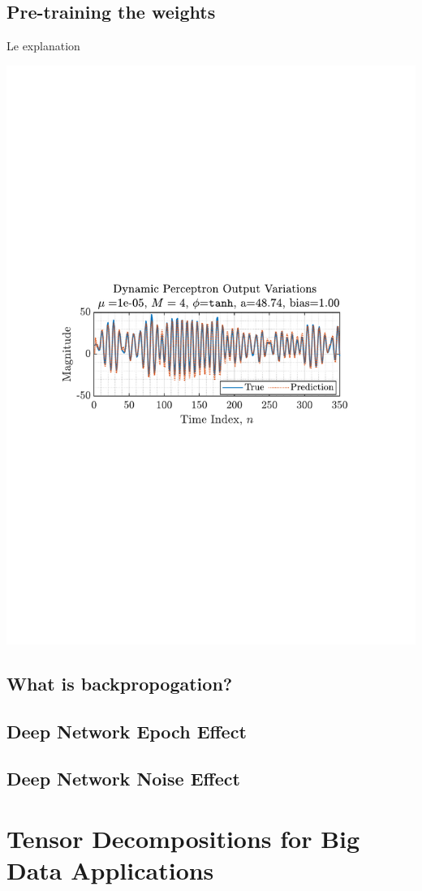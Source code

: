 \documentclass[12pt]{article}
\begin{document}
	\subsection{Pre-training the weights} \label{sec: 4-5-weight-training-dynamic-perceptron}
		\begin{minipage}[b]{0.49\textwidth}
			Le explanation
		\end{minipage}%
		\begin{minipage}{0.04\textwidth}
			\hspace*{0.04\textwidth}
		\end{minipage}%
		\begin{minipage}{0.49\textwidth}
			\centering
			\includegraphics[trim={2.2cm 11.2cm 3.15cm  11.2cm}, clip, width=\textwidth]{../MATLAB/figures/q4_5_fig01.pdf} 
			
			\captionsetup{justification=centering}
			\label{fig: 4-5}
		\end{minipage}%
	\subsection{What is backpropogation?} \label{sec: 4-6-backpropogation}
	\subsection{Deep Network Epoch Effect} \label{sec: 4-7-DL-epoch}
	\subsection{Deep Network Noise Effect} \label{sec: 4-7-DL-noise}
	
\section{Tensor Decompositions for Big Data Applications} \label{sec: 5-TD-BD}
	
\end{document}
